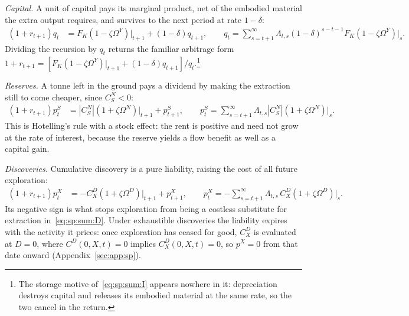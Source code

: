 \emph{Capital.} A unit of capital pays its marginal product, net of the embodied material the extra output requires, and survives to the next period at rate $1-\delta$:
\begin{align}
\left(1+r_{t+1}\right)q_t &= F_K\left(1-\zeta\Omega^Y\right)\Big|_{t+1}+\left(1-\delta\right)q_{t+1},
\qquad
q_t=\sum_{s=t+1}^\infty \Lambda_{t,s}\left(1-\delta\right)^{s-t-1}F_K\left(1-\zeta\Omega^Y\right)\Big|_s .
\label{eq:sp:sum:K}
\end{align}
Dividing the recursion by $q_t$ returns the familiar arbitrage form $1+r_{t+1}=\left[F_K\left(1-\zeta\Omega^Y\right)\big|_{t+1}+\left(1-\delta\right)q_{t+1}\right]/q_t$.\footnote{The storage motive of~\eqref{eq:sp:sum:I} appears nowhere in it: depreciation destroys capital and releases its embodied material at the same rate, so the two cancel in the return.}

\emph{Reserves.} A tonne left in the ground pays a dividend by making the extraction still to come cheaper, since $C^N_S<0$:
\begin{align}
\left(1+r_{t+1}\right)p^S_t &= \left|C^N_S\right|\left(1+\zeta\Omega^N\right)\Big|_{t+1}+p^S_{t+1},
\qquad
p^S_t=\sum_{s=t+1}^\infty \Lambda_{t,s}\left|C^N_S\right|\left(1+\zeta\Omega^N\right)\Big|_s .
\label{eq:sp:sum:S}
\end{align}
This is Hotelling's rule with a stock effect: the rent is positive and need not grow at the rate of interest, because the reserve yields a flow benefit as well as a capital gain.

\emph{Discoveries.} Cumulative discovery is a pure liability, raising the cost of all future exploration:
\begin{align}
\left(1+r_{t+1}\right)p^X_t &= -C^D_X\left(1+\zeta\Omega^D\right)\Big|_{t+1}+p^X_{t+1},
\qquad
p^X_t=-\sum_{s=t+1}^\infty \Lambda_{t,s}\,C^D_X\left(1+\zeta\Omega^D\right)\Big|_s .
\label{eq:sp:sum:X}
\end{align}
Its negative sign is what stops exploration from being a costless substitute for extraction in~\eqref{eq:sp:sum:D}. Under exhaustible discoveries the liability expires with the activity it prices: once exploration has ceased for good, $C^D_X$ is evaluated at $D=0$, where $C^D\left(0,X,t\right)=0$ implies $C^D_X\left(0,X,t\right)=0$, so $p^X=0$ from that date onward (Appendix~\ref{sec:app:sp}).

